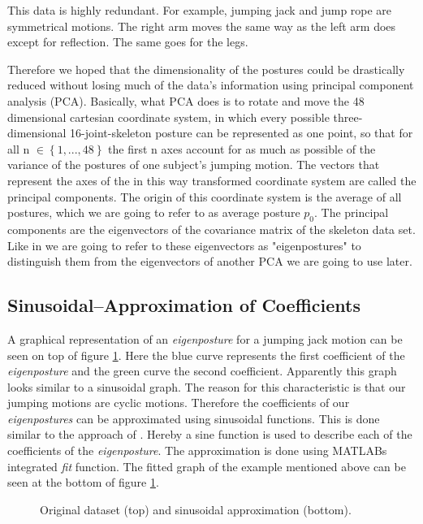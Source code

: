 \documentclass[a4paper]{article}
\begin{document}
This data is highly redundant.
For example, jumping jack and jump rope are symmetrical motions.
The right arm moves the same way as the left arm does except for reflection.
The same goes for the legs.

Therefore we hoped that the dimensionality of the postures could be drastically reduced without losing much of the data's information using principal component analysis (PCA).
Basically, what PCA does is to rotate and move the 48 dimensional cartesian coordinate system, in which every possible three-dimensional 16-joint-skeleton posture can be represented as one point, so that for all n $\in \left\{1, ..., 48\right\}$ the first n axes account for as much as possible of the variance of the postures of one subject's jumping motion.
The vectors that represent the axes of the in this way transformed coordinate system are called the principal components.
The origin of this coordinate system is the average of all postures, which we are going to refer to as average posture $p_{0}$.
The principal components are the eigenvectors of the covariance matrix of the skeleton data set.
Like in \cite{origin} we are going to refer to these eigenvectors as "eigenpostures" to distinguish them from the eigenvectors of another PCA we are going to use later.

\subsection{Sinusoidal--Approximation of Coefficients}
A graphical representation of an \emph{eigenposture} for a jumping jack motion can be seen on top of figure \ref{fig:approx}.
Here the blue curve represents the first coefficient of the \emph{eigenposture} and the green curve the second coefficient.
Apparently this graph looks similar to a sinusoidal graph.
The reason for this characteristic is that our jumping motions are cyclic motions.
Therefore the coefficients of our \emph{eigenpostures} can be approximated using sinusoidal functions.
This is done similar to the approach of \cite{origin}.
Hereby a sine function is used to describe each of the coefficients of the \emph{eigenposture}.
The approximation is done using MATLABs integrated \emph{fit} function.
The fitted graph of the example mentioned above can be seen at the bottom of figure \ref{fig:approx}.

\begin{figure}[htb]
		\centering
		\caption{Original dataset (top) and sinusoidal approximation (bottom).}
		\label{fig:approx}
\end{figure}
\end{document}
